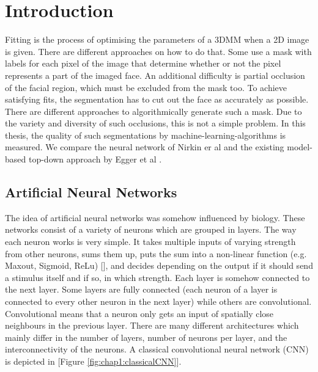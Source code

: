\chapter{Introduction}
Fitting is the process of optimising the parameters of a 3DMM when a 2D image is given. There are different approaches on how to do that. Some use a mask with labels for each pixel of the image that determine whether or not the pixel represents a part of the imaged face. An additional difficulty is partial occlusion of the facial region, which must be excluded from the mask too. To achieve satisfying fits, the segmentation has to cut out the face as accurately as possible. There are different approaches to algorithmically generate such a mask. Due to the variety and diversity of such occlusions, this is not a simple problem. In this thesis, the quality of such segmentations by machine-learning-algorithms is measured. We compare the neural network of Nirkin er al \cite{nirkin2018_faceswap} and the existing model-based top-down approach by Egger et al \cite{egger_paper}.


\section{Artificial Neural Networks}
The idea of artificial neural networks was somehow influenced by biology. These networks consist of a variety of neurons which are grouped in layers. The way each neuron works is very simple. It takes multiple inputs of varying strength from other neurons, sums them up, puts the sum into a non-linear function (e.g. Maxout, Sigmoid, ReLu) [], and decides depending on the output if it should send a stimulus itself and if so, in which strength. Each layer is somehow connected to the next layer. Some layers are fully connected (each neuron of a layer is connected to every other neuron in the next layer) while others are convolutional. Convolutional means that a neuron only gets an input of spatially close neighbours in the previous layer. There are many different architectures which mainly differ in the number of layers, number of neurons per layer, and the interconnectivity of the neurons. A classical convolutional neural network (CNN) is depicted in [Figure \ref{fig:chap1:classicalCNN}].

